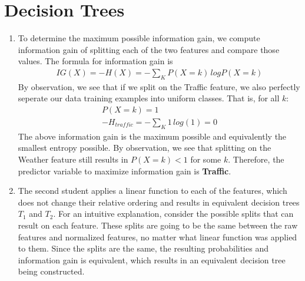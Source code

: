 \documentclass[12pt]{article}
\begin{document}
\section{Decision Trees}
\begin{enumerate}[label=\alph*.]
    \item 
	To determine the maximum possible information gain, we compute information gain of splitting each of the two features and compare those values. The formula for information gain is
	\begin{gather*}
		IG(X) = -H(X) = - \sum_K{P(X = k) \, log P(X = k)}
	\end{gather*}
	By observation, we see that if we split on the Traffic feature, we also perfectly seperate our data training examples into uniform classes. That is, for all $k$:
	\begin{gather*}
		P(X = k) = 1 \\ 
		-H_{traffic} = - \sum_K{ 1 \, log(1) } = 0
	\end{gather*}
	The above information gain is the maximum possible and equivalently the smallest entropy possible. By observation, we see that splitting on the Weather feature still results in $ P(X = k) < 1 $ for some $k$. Therefore, the predictor variable to maximize information gain is \textbf{Traffic}.

    \item
	The second student applies a linear function to each of the features, which does not change their relative ordering and results in equivalent decision trees $ T_1 $ and $ T_2 $. For an intuitive explanation, consider the possible splits that can result on each feature. These splits are going to be the same between the raw features and normalized features, no matter what linear function was applied to them. Since the splits are the same, the resulting probabilities and information gain is equivalent, which results in an equivalent decision tree being constructed. 


\end{enumerate}
\end{document}
